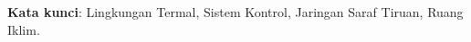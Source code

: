 \lipsum[100-101]

\vspace{0.5cm}
\hspace{-1.2cm}
\textbf{Kata kunci}: Lingkungan Termal, Sistem Kontrol, Jaringan Saraf Tiruan, Ruang Iklim.


